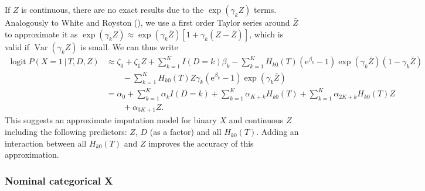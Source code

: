 \documentclass[
  letterpaper,
  DIV=11,
  numbers=noendperiod]{scrreprt}
\DeclareMathOperator{\logit}{logit}
\DeclareMathOperator{\Var}{Var}
\newcommand{\given}{\,|\,}
\begin{document}
If \(Z\) is continuous, there are no exact results due to the
\(\exp(\gamma_k Z)\) terms. Analogously to White and Royston
(), we use a first
order Taylor series around \(\bar{Z}\) to approximate it as
\(\exp(\gamma_k Z) \approx \exp(\gamma_k \bar{Z}) [ 1 + \gamma_k(Z - \bar{Z})  ]\),
which is valid if \(\Var(\gamma_k Z)\) is small. We can thus write
\begin{align*}
    \logit P(X = 1 \given T, D, Z) &\approx \zeta_0 + \zeta_1 Z + \sum^K_{k = 1} I(D=k) \beta_k \nonumber - \sum^K_{k = 1} H_{k0}(T)(\mathrm{e}^{\beta_k}  - 1)\exp(\gamma_k \bar{Z})(1 - \gamma_k \bar{Z}) \nonumber \\
    &\qquad - \sum^K_{k = 1} H_{k0}(T) Z \gamma_k (\mathrm{e}^{\beta_k}  - 1)\exp(\gamma_k \bar{Z}) \nonumber \\
    &= \alpha_0  + \sum^K_{k = 1} \alpha_{k} I(D=k) + \sum^K_{k = 1} \alpha_{K + k} H_{k0}(T) + \sum^K_{k = 1} \alpha_{2K + k} H_{k0}(T) Z \nonumber \\
    &\qquad + \alpha_{3K + 1} Z.
\end{align*} This suggests an approximate imputation model for binary
\(X\) and continuous \(Z\) including the following predictors: \(Z\),
\(D\) (as a factor) and all \(H_{k0}(T)\). Adding an interaction between
all \(H_{k0}(T)\) and \(Z\) improves the accuracy of this approximation.

\subsubsection*{Nominal categorical X}\label{nominal-categorical-x-1}
\end{document}
